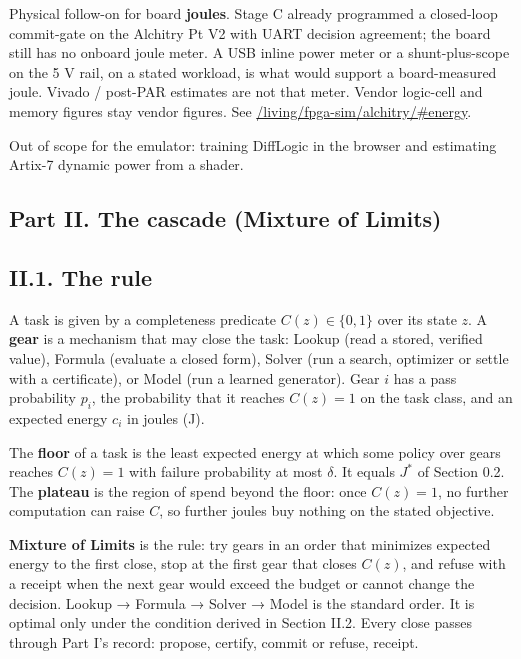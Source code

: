 \documentclass[
  10pt,
]{article}
\begin{document}
Physical follow-on for board \textbf{joules}. Stage C already programmed
a closed-loop commit-gate on the Alchitry Pt V2 with UART decision
agreement; the board still has no onboard joule meter. A USB inline
power meter or a shunt-plus-scope on the 5 V rail, on a stated workload,
is what would support a board-measured joule. Vivado / post-PAR
estimates are not that meter. Vendor logic-cell and memory figures stay
vendor figures. See
\href{https://research.openie.dev/living/fpga-sim/alchitry/\#energy}{/living/fpga-sim/alchitry/\#energy}.

Out of scope for the emulator: training DiffLogic in the browser and
estimating Artix-7 dynamic power from a shader.

\subsection{Part II. The cascade (Mixture of
Limits)}\label{part-ii.-the-cascade-mixture-of-limits}

\subsection{II.1. The rule}\label{ii.1.-the-rule}

A task is given by a completeness predicate \(C(z) \in \{0, 1\}\) over
its state \(z\). A \textbf{gear} is a mechanism that may close the task:
Lookup (read a stored, verified value), Formula (evaluate a closed
form), Solver (run a search, optimizer or settle with a certificate), or
Model (run a learned generator). Gear \(i\) has a pass probability
\(p_i\), the probability that it reaches \(C(z) = 1\) on the task class,
and an expected energy \(c_i\) in joules (J).

The \textbf{floor} of a task is the least expected energy at which some
policy over gears reaches \(C(z) = 1\) with failure probability at most
\(\delta\). It equals \(J^*\) of Section 0.2. The \textbf{plateau} is
the region of spend beyond the floor: once \(C(z) = 1\), no further
computation can raise \(C\), so further joules buy nothing on the stated
objective.

\textbf{Mixture of Limits} is the rule: try gears in an order that
minimizes expected energy to the first close, stop at the first gear
that closes \(C(z)\), and refuse with a receipt when the next gear would
exceed the budget or cannot change the decision. Lookup → Formula →
Solver → Model is the standard order. It is optimal only under the
condition derived in Section II.2. Every close passes through Part I's
record: propose, certify, commit or refuse, receipt.
\end{document}
